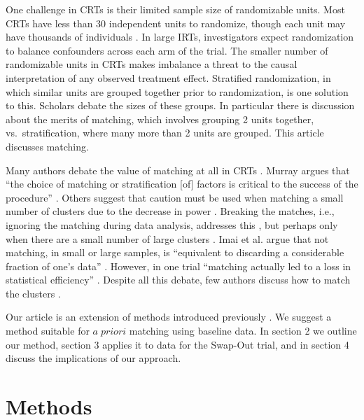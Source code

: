\documentclass[]{article}
\begin{document}
One challenge in CRTs is their limited sample size of randomizable
units. Most CRTs have less than 30 independent units to randomize,
though each unit may have thousands of individuals
\citep{balzer2012match}. In large IRTs, investigators expect
randomization to balance confounders across each arm of the trial. The
smaller number of randomizable units in CRTs makes imbalance a threat to
the causal interpretation of any observed treatment effect. Stratified
randomization, in which similar units are grouped together prior to
randomization, is one solution to this. Scholars debate the sizes of
these groups. In particular there is discussion about the merits of
matching, which involves grouping 2 units together, vs.~stratification,
where many more than 2 units are grouped\citep{PMVsStrat}. This article
discusses matching.

Many authors debate the value of matching at all in CRTs
\citep{balzer2012match, CRTrials2009, gatsonis2017methods, diehr1995breaking, murray1998design, imai2009essential, PMVsStrat, donner2007merits, klar1997merits, donner2000design, martin1993effect}.
Murray argues that ``the choice of matching or stratification {[}of{]}
factors is critical to the success of the procedure''
\citep{murray1998design}. Others suggest that caution must be used when
matching a small number of clusters due to the decrease in power
\citep{donner2000design, klar1997merits, balzer2012match, martin1993effect}.
Breaking the matches, i.e., ignoring the matching during data analysis,
addresses this \citep{diehr1995breaking}, but perhaps only when there
are a small number of large clusters \citep{donner2007merits}. Imai et
al. argue that not matching, in small or large samples, is ``equivalent
to discarding a considerable fraction of one's data''
\citep{imai2009essential}. However, in one trial ``matching actually led
to a loss in statistical efficiency''
\citep[\citet{donner2000design}]{manun1994influence}. Despite all this
debate, few authors discuss how to match the clusters
\citep{raab2001balance}.

Our article is an extension of methods introduced previously
\citep{gatsonis2017methods}. We suggest a method suitable for
\(a \; priori\) matching using baseline data. In section 2 we outline
our method, section 3 applies it to data for the Swap-Out trial, and in
section 4 discuss the implications of our approach.

\section{Methods}\label{methods}
\end{document}
